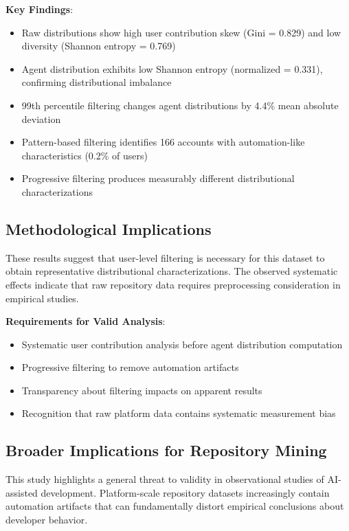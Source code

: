 \documentclass[conference]{IEEEtran}
\begin{document}
\textbf{Key Findings}:
\begin{itemize}
    \item Raw distributions show high user contribution skew (Gini = 0.829) and low diversity (Shannon entropy = 0.769)
    \item Agent distribution exhibits low Shannon entropy (normalized = 0.331), confirming distributional imbalance
    \item 99th percentile filtering changes agent distributions by 4.4\% mean absolute deviation
    \item Pattern-based filtering identifies 166 accounts with automation-like characteristics (0.2\% of users)
    \item Progressive filtering produces measurably different distributional characterizations
\end{itemize}

\subsection{Methodological Implications}

These results suggest that user-level filtering is necessary for this dataset to obtain representative distributional characterizations. The observed systematic effects indicate that raw repository data requires preprocessing consideration in empirical studies.

\textbf{Requirements for Valid Analysis}:
\begin{itemize}
    \item Systematic user contribution analysis before agent distribution computation
    \item Progressive filtering to remove automation artifacts  
    \item Transparency about filtering impacts on apparent results
    \item Recognition that raw platform data contains systematic measurement bias
\end{itemize}

\subsection{Broader Implications for Repository Mining}

This study highlights a general threat to validity in observational studies of AI-assisted development. Platform-scale repository datasets increasingly contain automation artifacts that can fundamentally distort empirical conclusions about developer behavior.
\end{document}
